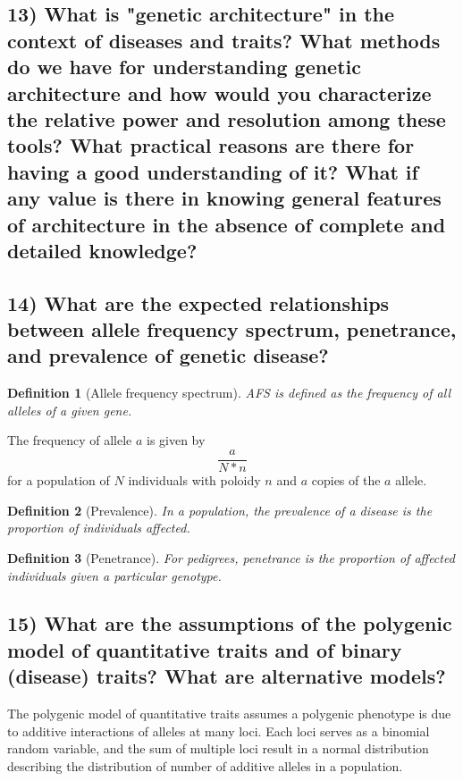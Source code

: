 \documentclass{tufte-handout}
\theoremstyle{noparens}
\newtheorem*{define}{Definition}
\begin{document}
\subsection{13) What is "genetic architecture" in the context of diseases and traits? What methods do we have for understanding genetic architecture and how would you characterize the relative power and resolution among these tools? What practical reasons are there for having a good understanding of it? What if any value is there in knowing general features of architecture in the absence of complete and detailed knowledge?}

\newpage
\subsection{14) What are the expected relationships between allele frequency spectrum, penetrance, and prevalence of genetic disease?}

\begin{define}[Allele frequency spectrum]
AFS is defined as the frequency of all alleles of a given gene.
\end{define}

The frequency of allele $a$ is given by \[\frac{a}{N*n} \] for a population of $N$ individuals with poloidy $n$ and $a$ copies of the $a$ allele.

\begin{define}[Prevalence]
In a population, the prevalence of a disease is the proportion of individuals affected.
\end{define}

\begin{define}[Penetrance]
For pedigrees, penetrance is the proportion of affected individuals given a particular genotype.
\end{define}


\newpage
\subsection{15) What are the assumptions of the polygenic model of quantitative traits and of binary (disease) traits? What are alternative models?}

The polygenic model of quantitative traits assumes a polygenic phenotype is due to additive interactions of alleles at many loci. Each loci serves as a binomial random variable, and the sum of multiple loci result in a normal distribution describing the distribution of number of additive alleles in a population.
\end{document}
